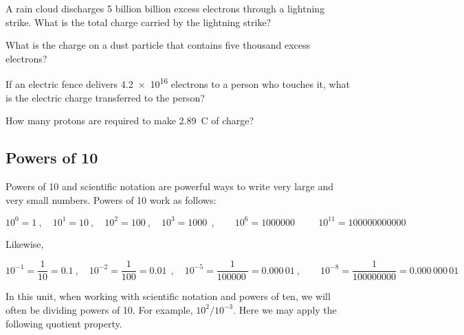 \documentclass[main.tex]{subfiles}
\begin{document}
\begin{multicols}{2}
\begin{exercise} \label{gEsEJ7}
    A rain cloud discharges 5 billion billion excess electrons through a lightning strike. What is the total charge carried by the lightning strike?
\end{exercise}



\begin{exercise} \label{d3zygU}
    What is the charge on a dust particle that contains five thousand excess electrons?
\end{exercise}

\begin{exercise} \label{ERkfIH}
    If an electric fence delivers \SI{4.2e16}{} electrons to a person who touches it, what is the electric charge transferred to the person?
\end{exercise}

\begin{exercise} \label{9qwZGy}
    How many protons are required to make \SI{2.89}{C} of charge?
\end{exercise}

\end{multicols}

\cyanhrule

\subsection{Powers of 10} \label{tdVujC}

Powers of 10 and scientific notation are powerful ways to write very large and very small numbers. Powers of 10 work as follows:

\begin{equation*}
    10^0 = 1\ , \quad 10^1 = 10\ , \quad 10^2 = 100\ , \quad 10^3 = \SI{1000}{}\ , \qquad 10^6 = \SI{1000000}{}\ \qquad 10^{11} = \SI{100000000000}{}
\end{equation*}

Likewise,

\begin{equation*}
    10^{-1} = \frac{1}{10} = 0.1\ , \quad
    10^{-2} = \frac{1}{100} = \SI{0.01}{}\ , \quad 
    10^{-5} = \frac{1}{\SI{100000}{}} = 0.000\,01\ ,\qquad
    10^{-8} = \frac{1}{\num{100000000}} = 0.000\,000\,01
\end{equation*}

In this unit, when working with scientific notation and powers of ten, we will often be dividing powers of 10. For example, $10^2/10^{-3}$. Here we may apply the following quotient property.
\end{document}

